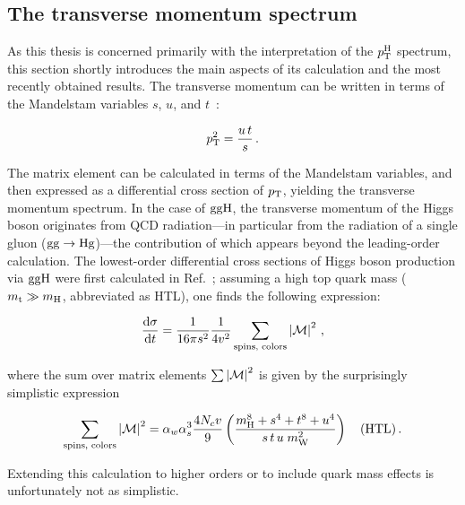 \subsection{The transverse momentum spectrum}
\label{sec:theory-pt}

As this thesis is concerned primarily with the interpretation of the $p_\mathrm{T}^\mathrm{H}$ spectrum, this section shortly introduces the main aspects of its calculation and the most recently obtained results.
% 
The transverse momentum can be written in terms of the Mandelstam variables $s$, $u$, and $t$~\cite{peskin}:
% 
\begin{linenomath*}
\begin{equation}
p_\mathrm{T}^2 = \frac{u \, t}{s}
\,.
\end{equation}
\end{linenomath*}
% 
The matrix element can be calculated in terms of the Mandelstam variables, and then expressed as a differential cross section of $p_\mathrm{T}$, yielding the transverse momentum spectrum.
% 
In the case of $\mathrm{g}\mathrm{g}\mathrm{H}$, the transverse momentum of the Higgs boson originates from QCD radiation---in particular from the radiation of a single gluon ($\mathrm{g}\mathrm{g}\to\mathrm{H}\mathrm{g}$)---the contribution of which appears beyond the leading-order calculation.
% 
The lowest-order differential cross sections of Higgs boson production via $\mathrm{g}\mathrm{g}\mathrm{H}$ were first calculated in Ref.~\cite{Ellis:1987xu}; assuming a high top quark mass ($m_{\mathrm{t}} \gg m_{\mathrm{H}}$, abbreviated as HTL), one finds the following expression:
% 
\begin{linenomath*}
\begin{equation}
\frac{\mathrm{d}\sigma}{\mathrm{d}t} =
\frac{1}{16\pi s^2} \frac{1}{4v^2}
\sum_\text{spins, colors} \left| \mathcal{M} \right |^2
\,,
\end{equation}
\end{linenomath*}
% 
where the sum over matrix elements $\sum\left| \mathcal{M} \right |^2$ is given by the surprisingly simplistic expression
% 
\begin{linenomath*}
\begin{equation}
\sum_\text{spins, colors} \abs{\mathcal{M}}^2
= \alpha_w \alpha_s^3 \frac{4 N_c v}{9} %
\left(
    \frac{\mh^8 + s^4 + t^8 + u^4}{ s \, t \, u \; m_\wboson^2 }
    \right)
\quad \text{(HTL)}
\,.
\end{equation}
\end{linenomath*}
% 
Extending this calculation to higher orders or to include quark mass effects is unfortunately not as simplistic.
